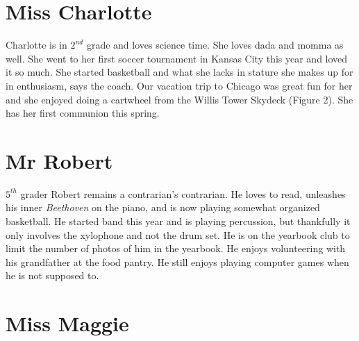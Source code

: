 \documentclass[letterpaper,11pt]{article}
\makeatletter
\newenvironment{figurehere}
  {\def\@captype{figure}}
  {}
\makeatother
\begin{document}
\begin{multicols}{2}
\section{Miss Charlotte}

Charlotte is in ${2}^{nd}$ grade and loves science time.  She loves dada and
momma as well. She went to her first soccer tournament in Kansas City this year and
loved it so much. She started basketball and what she lacks in stature she
makes up for in enthusiasm, says the coach. Our vacation trip to Chicago was great fun for her
and she enjoyed doing a cartwheel from the Willis Tower Skydeck (Figure 2). She
has her first communion this spring.

\begin{figurehere}
    \centering   
    \caption{Charlotte tempting fate by testing strength of glass at \SI{412}{\meter} AGL.}
\end{figurehere}


\section{Mr Robert}

${5}^{th}$ grader Robert remains a contrarian's contrarian. He loves
to read, unleashes his inner \textit{Beethoven} on the piano, and is now playing somewhat
organized basketball. He started band this year and is playing percussion,
but thankfully it only involves the xylophone and not the drum set. He is on the
yearbook club to limit the number of photos of him in the yearbook. He
enjoys volunteering with his grandfather at the food pantry. He still enjoys
playing computer games when he is not supposed to.

\section{Miss Maggie}

\begin{figurehere}
    \centering   
    \caption{Maggie with her 2024 birthday donation haul and associated product placement
    hoping for future sponsorship.}
\end{figurehere}


\end{multicols}
\end{document}
